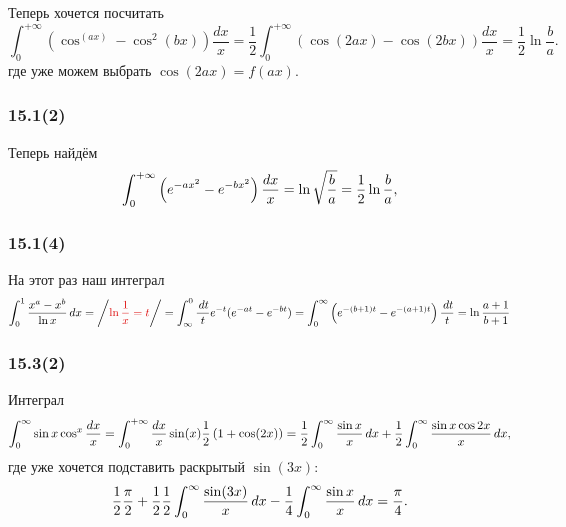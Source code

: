 Теперь хочется посчитать
\begin{equation*}
    \int_{0}^{+\infty}  \left(
        \cos^ (ax) - \cos^2 (bx)
    \right) \frac{dx}{x} = \frac{1}{2} \int_{0}^{+\infty}  \left(
        \cos(2ax) - \cos(2 b x)
    \right) \frac{dx}{x} = \frac{1}{2} \ln \frac{b}{a}.
\end{equation*}
где уже можем выбрать $\cos (2ax) = f(ax)$. 

\subsubsection*{15.1(2)}

Теперь найдём
\begin{equation*}
    \int_{0}^{+\infty}  \left(
        e^{-ax^2} - e^{-bx^2}
    \right) \frac{dx}{x} = \ln \sqrt{\frac{b}{a}} = \frac{1}{2} \ln \frac{b}{a},
\end{equation*}

\subsubsection*{15.1(4)}

На этот раз наш интеграл
\begin{equation*}
    \int_0^1 \frac{x^a - x^b}{\ln x} \d x = \bigg/
    \red{
        \ln \frac{1}{x} = t
    }
    \bigg/ = 
    \int_{\infty}^0 \frac{\d t}{t} e^{-t} (e^{-at} - e^{-bt}) = 
    \int_0^\infty \l(
        e^{-(b+1)t} - e^{-(a+1)t}
    \r) \frac{\d t}{t} = \ln \frac{a+1}{b+1}
\end{equation*}


\subsubsection*{15.3(2)}

Интеграл
\begin{equation*}
    \int_0^\infty \sin x \cos^ x \frac{dx}{x} = \int_{0}^{+\infty} 
    \frac{dx}{x}\sin(x) \frac{1}{2} \left(
        1 + \cos (2x)
    \right) = \frac{1}{2} \int_0^\infty \frac{\sin x}{x} \, d x + 
    \frac{1}{2} \int_0^\infty \frac{\sin x \cos 2 x}{x} \, d x,
\end{equation*}
где уже хочется подставить раскрытый $\sin (3 x)$:
\begin{equation*}
    \frac{1}{2} \frac{\pi}{2} + \frac{1}{2} \frac{1}{2} \int_0^\infty \frac{\sin(3x)}{x} \, d x -
    \frac{1}{4} \int_0^\infty \frac{\sin x}{x} \, d x = \frac{\pi}{4}.
\end{equation*}


